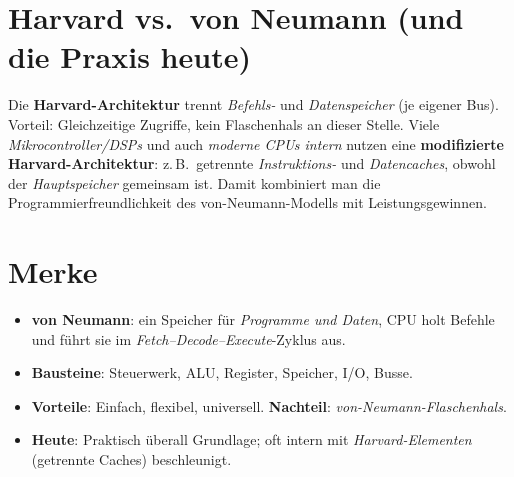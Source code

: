 \documentclass[../skript/main.tex]{subfiles}
\begin{document}
\section{Harvard vs.\ von Neumann (und die Praxis heute)}
Die \textbf{Harvard-Architektur} trennt \emph{Befehls-} und \emph{Datenspeicher} (je eigener Bus).
Vorteil: Gleichzeitige Zugriffe, kein Flaschenhals an dieser Stelle. Viele \emph{Mikrocontroller/DSPs}
und auch \emph{moderne CPUs intern} nutzen eine \textbf{modifizierte Harvard-Architektur}:
z.\,B.\ getrennte \emph{Instruktions-} und \emph{Datencaches}, obwohl der \emph{Hauptspeicher} gemeinsam ist.
Damit kombiniert man die Programmierfreundlichkeit des von-Neumann-Modells mit Leistungsgewinnen.

\section{Merke}
\begin{itemize}
	\item \textbf{von Neumann}: ein Speicher für \emph{Programme und Daten}, CPU holt Befehle und führt sie im \emph{Fetch–Decode–Execute}-Zyklus aus.
	\item \textbf{Bausteine}: Steuerwerk, ALU, Register, Speicher, I/O, Busse.
	\item \textbf{Vorteile}: Einfach, flexibel, universell. \textbf{Nachteil}: \emph{von-Neumann-Flaschenhals}.
	\item \textbf{Heute}: Praktisch überall Grundlage; oft intern mit \emph{Harvard-Elementen} (getrennte Caches) beschleunigt.
\end{itemize}

	
\end{document}
